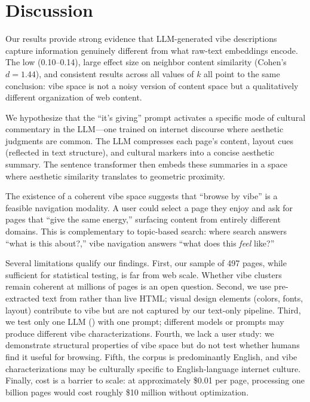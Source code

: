 \section{Discussion}
\label{sec:discussion}

Our results provide strong evidence that LLM-generated vibe descriptions capture information genuinely different from what raw-text embeddings encode.
The low \ari (0.10--0.14), large effect size on neighbor content similarity (Cohen's $d{=}1.44$), and consistent results across all values of $k$ all point to the same conclusion: vibe space is not a noisy version of content space but a qualitatively different organization of web content.

We hypothesize that the ``it's giving'' prompt activates a specific mode of cultural commentary in the LLM---one trained on internet discourse where aesthetic judgments are common.
The LLM compresses each page's content, layout cues (reflected in text structure), and cultural markers into a concise aesthetic summary.
The sentence transformer then embeds these summaries in a space where aesthetic similarity translates to geometric proximity.

The existence of a coherent vibe space suggests that ``browse by vibe'' is a feasible navigation modality.
A user could select a page they enjoy and ask for pages that ``give the same energy,'' surfacing content from entirely different domains.
This is complementary to topic-based search: where search answers ``what is this about?,'' vibe navigation answers ``what does this \emph{feel} like?''

Several limitations qualify our findings.
First, our sample of 497 pages, while sufficient for statistical testing, is far from web scale.
Whether vibe clusters remain coherent at millions of pages is an open question.
Second, we use pre-extracted text from \cfour rather than live HTML; visual design elements (colors, fonts, layout) contribute to vibe but are not captured by our text-only pipeline.
Third, we test only one LLM (\gptfour) with one prompt; different models or prompts may produce different vibe characterizations.
Fourth, we lack a user study: we demonstrate structural properties of vibe space but do not test whether humans find it useful for browsing.
Fifth, the \cfour corpus is predominantly English, and vibe characterizations may be culturally specific to English-language internet culture.
Finally, cost is a barrier to scale: at approximately \$0.01 per page, processing one billion pages would cost roughly \$10 million without optimization.

